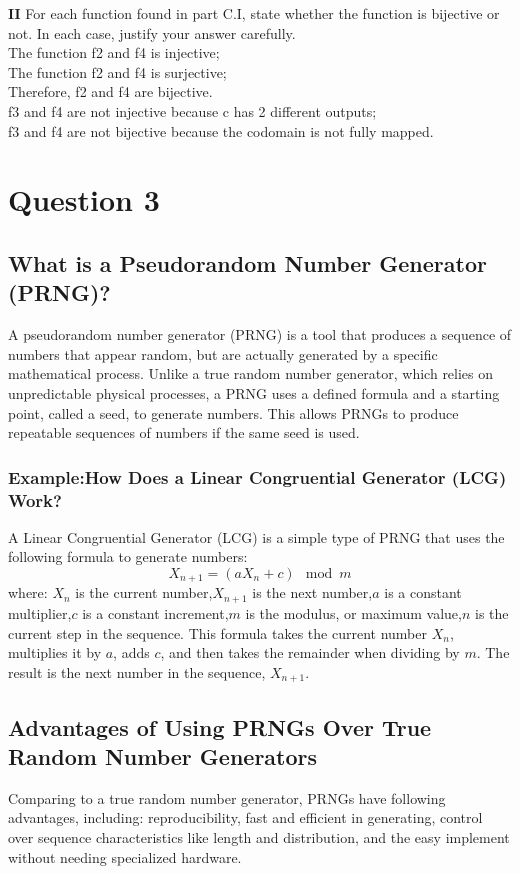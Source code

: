 \documentclass{article}
\begin{document}
		\textbf{II}
		For each function found in part C.I, state whether the function is bijective or not. In each case, justify your answer carefully.\\
		\noindent	
		The function f2 and f4 is injective;\\
		The function f2 and f4 is surjective;\\
		Therefore, f2 and f4 are bijective.\\
		\noindent
		f3 and f4 are not injective because {c} has 2 different outputs;\\
		f3 and f4 are not bijective because the codomain is not fully mapped.\\ 
		\par
		
		\newpage
	\section{Question 3}
	\subsection*{What is a Pseudorandom Number Generator (PRNG)?}
	A pseudorandom number generator (PRNG) is a tool that produces a sequence of numbers that appear random, but are actually generated by a specific mathematical process. Unlike a true random number generator, which relies on unpredictable physical processes, a PRNG uses a defined formula and a starting point, called a seed, to generate numbers. This allows PRNGs to produce repeatable sequences of numbers if the same seed is used.
	\subsubsection*{Example:How Does a Linear Congruential Generator (LCG) Work?}
	A Linear Congruential Generator (LCG) is a simple type of PRNG that uses the following formula to generate numbers:
	\[
	X_{n+1} = (aX_n + c) \mod m
	\]
	where:
	\(X_n\) is the current number,\(X_{n+1}\) is the next number,\(a\) is a constant multiplier,\(c\) is a constant increment,\(m\) is the modulus, or maximum value,\(n\) is the current step in the sequence.
	This formula takes the current number \(X_n\), multiplies it by \(a\), adds \(c\), and then takes the remainder when dividing by \(m\). The result is the next number in the sequence, \(X_{n+1}\).
	\subsection*{Advantages of Using PRNGs Over True Random Number Generators}
	Comparing to a true random number generator, PRNGs have following advantages, including: reproducibility, fast and efficient in generating, control over sequence characteristics like length and distribution, and the easy implement without needing specialized hardware.
\end{document}
